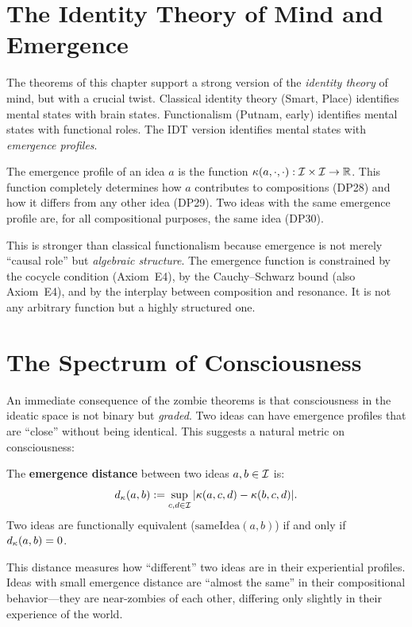 \section{The Identity Theory of Mind and Emergence}

The theorems of this chapter support a strong version of the
\emph{identity theory} of mind, but with a crucial twist.  Classical
identity theory (Smart, Place) identifies mental states with brain
states.  Functionalism (Putnam, early) identifies mental states with
functional roles.  The IDT version identifies mental states with
\emph{emergence profiles}.

The emergence profile of an idea $a$ is the function
$\kappa(a, \cdot, \cdot) : \mathcal{I} \times \mathcal{I} \to \mathbb{R}$.  This function
completely determines how $a$ contributes to compositions (DP28) and
how it differs from any other idea (DP29).  Two ideas with the same
emergence profile are, for all compositional purposes, the same idea
(DP30).

This is stronger than classical functionalism because emergence is
not merely ``causal role'' but \emph{algebraic structure}.  The
emergence function is constrained by the cocycle condition
(Axiom~E4), by the Cauchy--Schwarz bound (also Axiom~E4), and by
the interplay between composition and resonance.  It is not any
arbitrary function but a highly structured one.

\section{The Spectrum of Consciousness}

An immediate consequence of the zombie theorems is that consciousness
in the ideatic space is not binary but \emph{graded}.  Two ideas can
have emergence profiles that are ``close'' without being identical.
This suggests a natural metric on consciousness:

\begin{definition}
\label{def:emergence-distance}
The \textbf{emergence distance} between two ideas $a, b \in \mathcal{I}$ is:
\[
d_{\kappa}(a, b) := \sup_{c, d \in \mathcal{I}}
|\kappa(a, c, d) - \kappa(b, c, d)|.
\]
Two ideas are functionally equivalent ($\mathrm{sameIdea}(a,b)$) if
and only if $d_{\kappa}(a, b) = 0$.
\end{definition}

This distance measures how ``different'' two ideas are in their
experiential profiles.  Ideas with small emergence distance are
``almost the same'' in their compositional behavior---they are
near-zombies of each other, differing only slightly in their
experience of the world.

